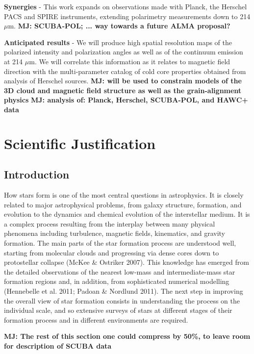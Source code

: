 \documentclass[11pt]{amsart}
\begin{document}
{\bf Synergies} - This work expands on observations made with Planck, the Herschel PACS and SPIRE instruments, extending polarimetry measurements down to 214 $\mu$m.  {\bf MJ: SCUBA-POL;
... way towards a future ALMA proposal?}

{\bf Anticipated results} - We will produce high spatial resolution maps of the polarized intensity and polarization angles as well as of the 
continuum emission at 214 $\mu$m. 
We will correlate this information as it relates to magnetic field direction with the multi-parameter catalog of cold core properties obtained from analysis of Herschel sources. {\bf MJ: will be used to constrain models of the 3D cloud and magnetic field structure as well as the grain-alignment physics}
{\bf MJ: analysis of: Planck, Herschel, SCUBA-POL, and HAWC+ data}

\newpage

\section{Scientific Justification}



\subsection{Introduction}
How stars form is one of the most central questions in astrophysics.
It is closely related to major astrophysical problems,
from galaxy structure, formation, and evolution to the dynamics
and chemical evolution of the interstellar medium. It is a complex
process resulting from the interplay between many physical
phenomena including turbulence, magnetic fields, kinematics,
and gravity formation. 
The main parts of the star formation process are understood well, starting from molecular
clouds and progressing via dense cores down to protostellar
collapse (McKee \& Ostriker 2007). This knowledge has
emerged from the detailed observations of the nearest low-mass
and intermediate-mass star formation regions and, in addition,
from sophisticated numerical modelling (Hennebelle et al. 2011;
Padoan \& Nordlund 2011). The next step in improving the overall
view of star formation consists in understanding the process
on the individual scale, and so extensive surveys of stars at different
stages of their formation process and in different environments
are required.

{\bf MJ: The rest of this section one could compress by 50\%, to leave room for description of SCUBA data}
\end{document}
